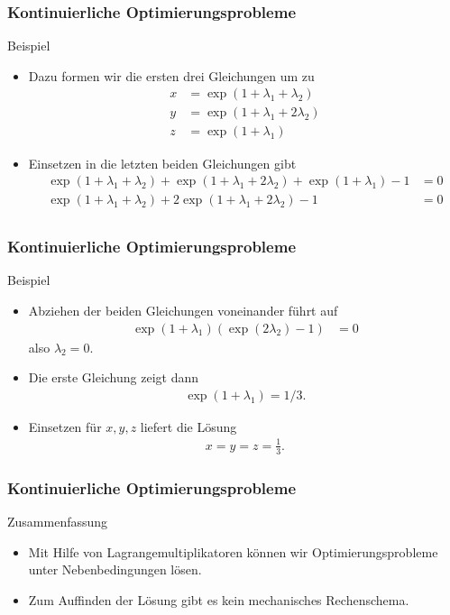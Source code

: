 \documentclass{beamer}
\renewcommand{\oe}{\"o}
\newcommand{\ue}{\"u}
\newcommand{\mytitle}{Kontinuierliche Optimierungsprobleme}
\begin{document}
\begin{frame}\frametitle{\mytitle}
	\begin{block}{Beispiel}
		\begin{itemize}
			\item Dazu formen wir die ersten drei Gleichungen um zu
				\begin{align*}
					x&=\exp(1+\lambda_1+\lambda_2)\\
					y&=\exp(1+\lambda_1+2\lambda_2)\\
					z&=\exp(1+\lambda_1)
				\end{align*}
			\item Einsetzen in die letzten beiden Gleichungen gibt
				\begin{align*}
					\exp(1+\lambda_1+\lambda_2)+\exp(1+\lambda_1+2\lambda_2)+\exp(1+\lambda_1)-1&=0\\
					\exp(1+\lambda_1+\lambda_2)+2\exp(1+\lambda_1+2\lambda_2)-1&=0\\
				\end{align*}
		\end{itemize}
	\end{block}
\end{frame}

\begin{frame}\frametitle{\mytitle}
	\begin{block}{Beispiel}
		\begin{itemize}
			\item Abziehen der beiden Gleichungen voneinander f\ue hrt auf
				\begin{align*}
					\exp(1+\lambda_1)(\exp(2\lambda_2)-1)&=0
				\end{align*}
				also $\lambda_2=0$.
			\item Die erste Gleichung zeigt dann
				\begin{align*}
					\exp(1+\lambda_1)=1/3.
				\end{align*}
			\item Einsetzen f\ue r $x,y,z$ liefert die L\oe sung
				\begin{align*}
				x=y=z=\frac{1}{3}.
				\end{align*}
		\end{itemize}
	\end{block}
\end{frame}

\begin{frame}\frametitle{\mytitle}
	\begin{block}{Zusammenfassung}
		\begin{itemize}
			\item Mit Hilfe von Lagrangemultiplikatoren k\oe nnen wir Optimierungsprobleme unter Nebenbedingungen l\oe sen.
			\item Zum Auffinden der L\oe sung gibt es kein mechanisches Rechenschema.
		\end{itemize}
	\end{block}
\end{frame}
\end{document}
